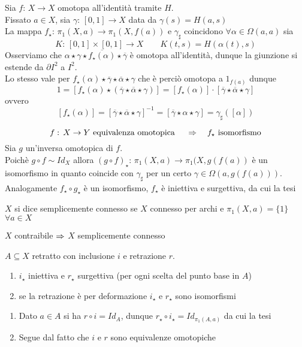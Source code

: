 \begin{prop}Sia $f:\, X \to X $ omotopa all'identit\`a tramite $H$.\\
Fissato $a\in X$, sia $\gamma:\, [0,1]\to X$ data da $\gamma(s)=H(a,s)$\\
La mappa $f_\star :\, \pi_1(X,a) \to \pi_1(X, f(a))$ e $\gamma_\sharp$ coincidono
\proof $\forall \alpha\in \Omega(a,a)$ sia 
$$ K:\, [0,1]\times [0,1] \to X \qquad K(t,s)=H(\alpha(t),s)$$
Osserviamo che $\alpha\star \gamma \star \overline{f_\star(\alpha)}\star \overline{\gamma}$ \`e omotopa all'identit\`a, dunque la giunzione si estende da $\partial I^2$ a $I^2$.\\
Lo stesso vale per $f_\star(\alpha) \star \overline{\gamma}\star \overline{\alpha}\star \gamma$ che \`e perci\`o omotopa a $1_{f(a)}$ dunque 
$$ 1=[ 
f_\star(\alpha)\star ( \overline{\gamma}
\star \overline{\alpha}\star \gamma ) ]
 = \left[ f_\star(\alpha) \right]\cdot [ \overline{\gamma}\star \overline{\alpha}\star \gamma]$$
ovvero 
$$ [f_\star(\alpha)]=[\overline{\gamma}\star \overline{\alpha}\star \gamma]^{-1}=[\overline{\gamma}\star \alpha\star \gamma]=\gamma_\sharp([\alpha])$$
\endproof
\end{prop}
\begin{thm}
$$f:\, X \to Y\text{ equivalenza omotopica } \quad \Rightarrow \quad f_\star \text{ isomorfismo}$$
\proof Sia $g$ un'inversa omotopica di $f$.\\
Poich\`e $g \circ f \sim Id_X$ allora $(g\circ f)_\star:\, \pi_1(X,a)\to \pi_1(X,g(f(a))$ \`e un isomorfismo in quanto coincide con $\gamma_\sharp$ per un certo $\gamma \in\Omega(a, g(f(a)))$.\\
Analogamente $f_\star \circ g_\star$ \`e un isomorfismo, $f_\star$ \`e iniettiva e surgettiva, da cui la tesi
\endproof
\end{thm}
\begin{defn}$X$ si dice semplicemente connesso se $X$ connesso per archi e $\pi_1(X,a)=\{ 1\} $ $\forall a\in X$
\end{defn}
\begin{cor}$X$ contraibile  $\Rightarrow$ $X$  semplicemente connesso
\end{cor}
\spazio
\begin{prop}$A\subseteq X$ retratto con inclusione $i$ e retrazione $r$.
\begin{enumerate}
\item $i_\star$ iniettiva e $r_\star$ surgettiva (per ogni scelta del punto base in $A$)
\item se la retrazione \`e per deformazione $i_\star$ e $r_\star$ sono isomorfismi

\end{enumerate}
\proof \bbianco
\begin{enumerate}
\item Dato $a\in A$ si ha $r\circ i=Id_A$, dunque $r_\star \circ i_\star= Id_{\pi_1(A,a)}$ da cui la tesi
\item Segue dal fatto che $i$ e $r$ sono equivalenze omotopiche
\end{enumerate}
\end{prop}
